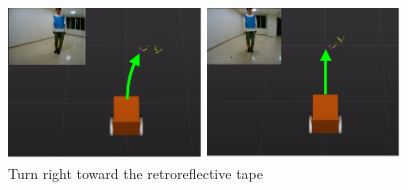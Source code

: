 \begin{figure}[h]
  \centering
  \begin{minipage}[c]{65mm} 
      \centering
      \includegraphics[height=40mm]{images/pdf/RobotGuidance_learning_turn_right_(a)}
  \end{minipage}
  \begin{minipage}[c]{65mm} 
      \centering
      \includegraphics[height=40mm]{images/pdf/RobotGuidance_learning_turn_right_(b)}
  \end{minipage}
  \caption{Turn right toward the retroreflective tape}
  \label{Fig:RobotGuidance_learning_turn_right}
\end{figure}

\newpage

